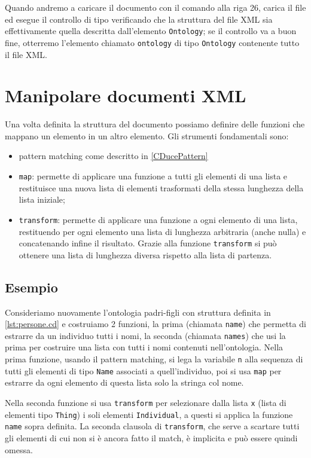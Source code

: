 Quando andremo a caricare il documento con il comando alla riga 26, \cduce carica il file ed esegue il controllo di tipo verificando che la struttura del file XML sia effettivamente quella descritta dall'elemento \verb|Ontology|; se il controllo va a buon fine, otterremo l'elemento chiamato \verb|ontology| di tipo \verb|Ontology| contenente tutto il file XML.
\section{Manipolare documenti XML}
Una volta definita la struttura del documento possiamo definire delle funzioni che mappano un elemento in un altro elemento. Gli strumenti fondamentali sono:
\begin{itemize}
	\item pattern matching come descritto in \ref{CDucePattern}
	\item \verb|map|\label{map}: permette di applicare una funzione a tutti gli elementi di una lista e restituisce una nuova lista di elementi trasformati della stessa lunghezza della lista iniziale;
	\item \verb|transform|: permette di applicare una funzione a ogni elemento di una lista, restituendo per ogni elemento una lista di lunghezza arbitraria (anche nulla) e concatenando infine il risultato. Grazie alla funzione \verb|transform| si può ottenere una lista di lunghezza diversa rispetto alla lista di partenza.
\end{itemize}
\subsection{Esempio}
Consideriamo nuovamente l'ontologia padri-figli con struttura definita in \ref{lst:persone.cd} e costruiamo 2 funzioni, la prima (chiamata \verb|name|) che permetta di estrarre da un individuo tutti i nomi, la seconda (chiamata \verb|names|) che usi la prima per costruire una lista con tutti i nomi contenuti nell'ontologia.
Nella prima funzione, usando il pattern matching, si lega la variabile \verb|n| alla sequenza di tutti gli elementi di tipo \verb|Name| associati a quell'individuo, poi si usa \verb|map| per estrarre da ogni elemento di questa lista solo la stringa col nome.

Nella seconda funzione si usa \verb|transform| per selezionare dalla lista \verb|x| (lista di elementi tipo \verb|Thing|) i soli elementi \verb|Individual|, a questi si applica la funzione \verb|name| sopra definita. La seconda clausola di \verb|transform|, che serve a scartare tutti gli elementi di cui non si è ancora fatto il match, è implicita e può essere quindi omessa.

